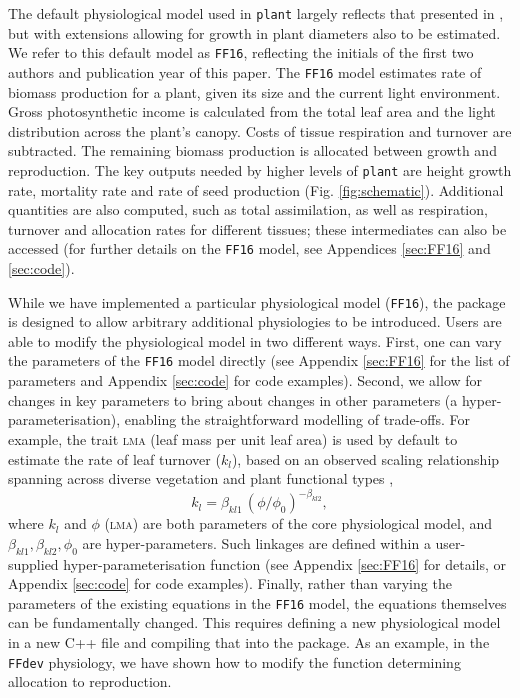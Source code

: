 \documentclass[a4paper,11pt]{article}
\newcommand{\plant}{\texttt{plant}}
\begin{document}
The default physiological model used in {\plant} largely reflects
that presented in \citet{Falster-2011, Falster-2015}, but with extensions
allowing for growth in plant diameters also to be estimated. We refer to this
default model as \texttt{FF16}, reflecting the initials of the first two authors
and publication year of this paper. The \texttt{FF16} model estimates rate
of biomass
production for a plant, given its size and the current light
environment. Gross photosynthetic income is calculated from the total
leaf area and the light distribution across the plant's canopy. Costs
of tissue respiration and turnover are subtracted. The remaining
biomass production is allocated between growth and reproduction. The key
outputs needed by higher levels of {\plant} are height
growth rate, mortality rate and rate of seed production (Fig. \ref{fig:schematic}). Additional quantities are also computed, such as total assimilation, as well as
respiration, turnover and allocation rates for different
tissues; these intermediates can also be accessed (for further details on the \texttt{FF16} model, see Appendices
\ref{sec:FF16} and \ref{sec:code}).

While we have implemented a particular physiological model
(\texttt{FF16}), the package is designed to allow arbitrary
additional physiologies to be introduced. Users are able to modify the
physiological model in two different ways. First, one can vary the
parameters of the \texttt{FF16} model directly (see Appendix
\ref{sec:FF16} for the list of parameters and Appendix \ref{sec:code} for code
examples). Second, we allow for changes in key parameters to bring
about changes in other parameters (a hyper-parameterisation), enabling the
straightforward modelling of trade-offs. For example, the
trait \textsc{lma} (leaf mass per unit leaf area) is used by default to estimate
the rate of leaf turnover ($k_l$), based on an observed scaling
relationship spanning across diverse vegetation and plant functional
types \citep{Wright-2004},
$$k_l = \beta_{kl1} \, \left(\phi / \phi_0\right)^{-\beta_{kl2}},$$
where $k_l$ and $\phi$ (\textsc{lma}) are both parameters of the core physiological
model, and $\beta_{kl1}, \beta_{kl2}, \phi_0$ are hyper-parameters. Such
linkages are defined within a user-supplied hyper-parameterisation function
(see Appendix \ref{sec:FF16} for details, or Appendix
\ref{sec:code} for code examples).
%
Finally, rather than varying the parameters of the existing equations
in the \texttt{FF16} model, the equations themselves can be
fundamentally changed. This requires defining a new physiological
model in a new C++ file and compiling that into the package. As an
example, in the \texttt{FFdev} physiology, we have shown how to modify the
function determining allocation to reproduction.
\end{document}
